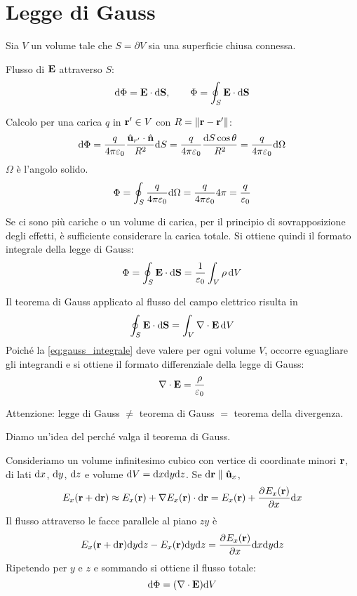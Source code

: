 \section{Legge di Gauss}

Sia $V$ un volume tale che $S = \partial V$ sia una superficie chiusa connessa.

Flusso di $\mathbf{E}$ attraverso $S$:
\begin{equation}
    \mathrm{d} \Phi = \mathbf{E} \cdot \mathrm{d} \mathbf{S}, \qquad \Phi = \oint_S \mathbf{E} \cdot \mathrm{d} \mathbf{S}
\end{equation}

Calcolo per una carica $q$ in $\mathbf{r}' \in V$ con $R = \left\lVert \mathbf{r} - \mathbf{r}' \right\rVert$:
\begin{equation}
    \mathrm{d} \Phi = \frac{q}{4\pi \varepsilon_0} \frac{\hat{\mathbf{u}}_{r'} \cdot \hat{\mathbf{n}}}{R^2} \mathrm{d} S = \frac{q}{4\pi \varepsilon_0} \frac{\mathrm{d} S \cos \theta}{R^2} = \frac{q}{4\pi \varepsilon_0} \mathrm{d} \Omega
\end{equation}
$\Omega$ è l'angolo solido.
\begin{equation}
    \Phi = \oint_S \frac{q}{4\pi \varepsilon_0} \mathrm{d} \Omega
    = \frac{q}{4\pi \varepsilon_0} 4\pi
    = \frac{q}{\varepsilon_0}
\end{equation}

Se ci sono più cariche o un volume di carica, per il principio di sovrapposizione degli effetti, è sufficiente considerare la carica totale.
Si ottiene quindi il formato integrale della legge di Gauss:
\begin{equation}
\label{eq:gauss_integrale}
    \Phi = \oint_S \mathbf{E} \cdot \mathrm{d} \mathbf{S} = \frac{1}{\varepsilon_0} \int_V \rho \, \mathrm{d} V
\end{equation}

Il teorema di Gauss applicato al flusso del campo elettrico risulta in
\begin{equation}
    \oint_S \mathbf{E} \cdot \mathrm{d} \mathbf{S} = \int_V \nabla \cdot \mathbf{E} \, \mathrm{d} V
\end{equation}
Poiché la \eqref{eq:gauss_integrale} deve valere per ogni volume $V$, occorre eguagliare gli integrandi e si ottiene il formato differenziale della legge di Gauss:
\begin{equation}
    \nabla \cdot \mathbf{E} = \frac{\rho}{\varepsilon_0}
\end{equation}

Attenzione: legge di Gauss $\ne$ teorema di Gauss $=$ teorema della divergenza.

Diamo un'idea del perché valga il teorema di Gauss.

Consideriamo un volume infinitesimo cubico con vertice di coordinate minori $\mathbf{r}$, di lati $\mathrm{d} x$, $\mathrm{d} y$, $\mathrm{d} z$ e volume $\mathrm{d} V = \mathrm{d} x \mathrm{d} y \mathrm{d} z$.
Se $\mathrm{d} \mathbf{r} \parallel \hat{\mathbf{u}}_{x}$,
\begin{equation}
    E_x(\p + \de \p) \approx E_x(\p) + \grad E_x(\p) \cdot \de \p = E_x(\p) + \parder[E_x(\p)]{x} \de x
\end{equation}
Il flusso attraverso le facce parallele al piano $zy$ è
\begin{equation}
    E_x(\p + \de \p) \de y \de z - E_x(\p) \de y \de z = \parder[E_x(\p)]{x} \de x \de y \de z
\end{equation}
Ripetendo per $y$ e $z$ e sommando si ottiene il flusso totale:
\begin{equation}
    \mathrm{d} \Phi = (\nabla \cdot \mathbf{E}) \mathrm{d} V
\end{equation}

